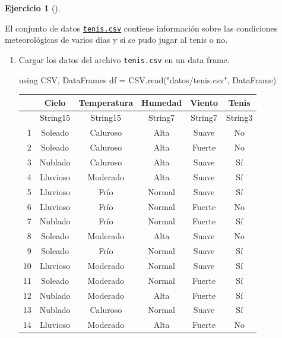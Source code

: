 \documentclass[
  a4paper,
]{scrreport}
\newenvironment{Shaded}{\begin{snugshade}}{\end{snugshade}}
\newcommand{\BuiltInTok}[1]{\textcolor[rgb]{0.00,0.23,0.31}{#1}}
\newcommand{\FunctionTok}[1]{\textcolor[rgb]{0.28,0.35,0.67}{#1}}
\newcommand{\ImportTok}[1]{\textcolor[rgb]{0.00,0.46,0.62}{#1}}
\newcommand{\NormalTok}[1]{\textcolor[rgb]{0.00,0.23,0.31}{#1}}
\newcommand{\OperatorTok}[1]{\textcolor[rgb]{0.37,0.37,0.37}{#1}}
\newcommand{\StringTok}[1]{\textcolor[rgb]{0.13,0.47,0.30}{#1}}
\theoremstyle{definition}
\newtheorem{exercise}{Ejercicio}[chapter]
\theoremstyle{remark}
\begin{document}
\begin{exercise}[]\protect\hypertarget{exr-arboles-decision-1}{}\label{exr-arboles-decision-1}

El conjunto de datos \href{./datos/tenis.csv}{\texttt{tenis.csv}}
contiene información sobre las condiciones meteorológicas de varios días
y si se pudo jugar al tenis o no.

\begin{enumerate}
\def\labelenumi{\alph{enumi}.}
\item
  Cargar los datos del archivo \texttt{tenis.csv} en un data frame.

  \begin{tcolorbox}[enhanced jigsaw, toptitle=1mm, breakable, toprule=.15mm, opacitybacktitle=0.6, coltitle=black, titlerule=0mm, arc=.35mm, title=\textcolor{quarto-callout-tip-color}{\faLightbulb}\hspace{0.5em}{Solución}, rightrule=.15mm, opacityback=0, colback=white, bottomrule=.15mm, leftrule=.75mm, colbacktitle=quarto-callout-tip-color!10!white, bottomtitle=1mm, colframe=quarto-callout-tip-color-frame, left=2mm]

\begin{Shaded}
\begin{Highlighting}[]
\ImportTok{using} \BuiltInTok{CSV}\NormalTok{, }\BuiltInTok{DataFrames}
\NormalTok{df }\OperatorTok{=}\NormalTok{ CSV.}\FunctionTok{read}\NormalTok{(}\StringTok{"datos/tenis.csv"}\NormalTok{, DataFrame)}
\end{Highlighting}
\end{Shaded}

  \begin{tabular}{r|ccccc}
      & Cielo & Temperatura & Humedad & Viento & Tenis\\
      \hline
      & String15 & String15 & String7 & String7 & String3\\
      \hline
      1 & Soleado & Caluroso & Alta & Suave & No \\
      2 & Soleado & Caluroso & Alta & Fuerte & No \\
      3 & Nublado & Caluroso & Alta & Suave & Sí \\
      4 & Lluvioso & Moderado & Alta & Suave & Sí \\
      5 & Lluvioso & Frío & Normal & Suave & Sí \\
      6 & Lluvioso & Frío & Normal & Fuerte & No \\
      7 & Nublado & Frío & Normal & Fuerte & Sí \\
      8 & Soleado & Moderado & Alta & Suave & No \\
      9 & Soleado & Frío & Normal & Suave & Sí \\
      10 & Lluvioso & Moderado & Normal & Suave & Sí \\
      11 & Soleado & Moderado & Normal & Fuerte & Sí \\
      12 & Nublado & Moderado & Alta & Fuerte & Sí \\
      13 & Nublado & Caluroso & Normal & Suave & Sí \\
      14 & Lluvioso & Moderado & Alta & Fuerte & No \\
  \end{tabular}


\end{tcolorbox}
\end{enumerate}
\end{exercise}
\end{document}
